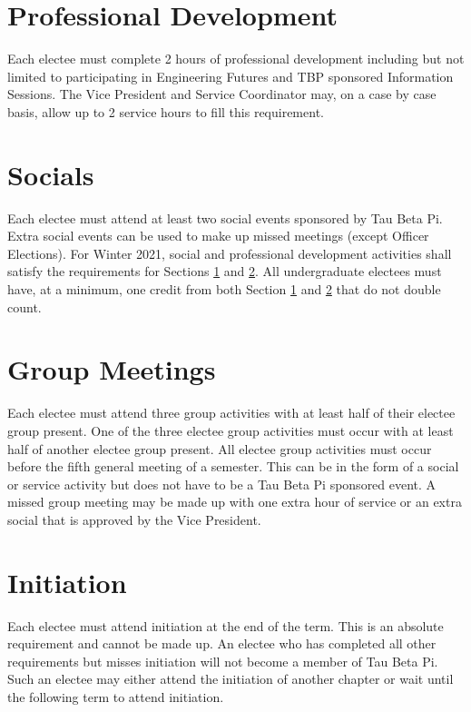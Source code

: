 \section{Professional Development}\label{sec:ugpdreq} Each electee must complete 2 hours of professional development including but not limited to participating in Engineering Futures and TBP sponsored Information Sessions. The Vice President and Service Coordinator may, on a case by case basis, allow up to 2 service hours to fill this requirement. %

\section{Socials}\label{sec:ugsocialreq} Each electee must attend at least two social events sponsored by Tau Beta Pi. Extra social  events can be used to make up missed meetings (except Officer Elections). For Winter 2021, social and professional development activities shall satisfy the requirements for Sections \ref{sec:ugpdreq} and \ref{sec:ugsocialreq}. All undergraduate electees must have, at a minimum, one credit from both Section \ref{sec:ugpdreq} and \ref{sec:ugsocialreq} that do not double count.
\section{Group Meetings} \label{group_meetings} Each electee must attend three group activities with at least half of their electee group present. One of the three electee group activities must occur with at least half of another electee group present. All electee group activities must occur before the fifth general meeting of a semester.  This can be in the form of a social or service activity but does not have to be a Tau Beta Pi sponsored event. A missed group meeting may be made up with one extra hour of service or an extra social that is approved by the Vice President.
\section{Initiation} Each electee must attend initiation at the end of the term. This is an absolute requirement and cannot be made up. An electee who has completed all other requirements but misses initiation will not become a member of Tau Beta Pi. Such an electee may either attend the initiation of another chapter or wait until the following term to attend initiation.

